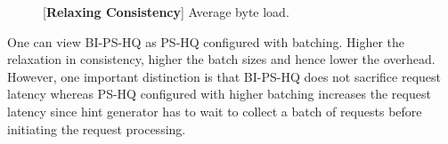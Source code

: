 \documentclass[twocolumn,10pt]{article}
\newcommand{\stitle}[1]{\vspace{2pt}{\bf #1:}}
\begin{document}
\begin{figure}[t]
\centering
\begin{minipage}[t]{0.47\textwidth}
\caption{\label{fig:mesg_comp_bi}[\textbf{Relaxed Consistency}] Average message load.}
\end{minipage}
\begin{minipage}[t]{0.47\textwidth}
\caption{\label{fig:bytes_comp_bi_new}[\textbf{Relaxing Consistency}] Average byte load.}
\end{minipage}
\end{figure}
\fi

\stitle{Summary} One can view BI-PS-HQ as PS-HQ configured with 
batching. Higher the relaxation in consistency, higher the batch sizes and hence lower the overhead. 
However, one important distinction
is that BI-PS-HQ does not sacrifice request latency whereas PS-HQ configured with higher batching increases
the request latency since hint generator has to wait to collect a batch of requests before initiating
the request processing.
\end{document}
